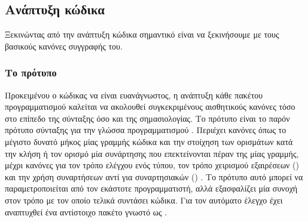 \subsection{Ανάπτυξη κώδικα}
Ξεκινώντας από την ανάπτυξη κώδικα σημαντικό είναι να ξεκινήσουμε με τους βασικούς κανόνες συγγραφής του.
\subsubsection{Το πρότυπο }
Προκειμένου ο κώδικας να είναι ευανάγνωστος, η ανάπτυξη κάθε πακέτου προγραμματισμού  καλείται να ακολουθεί συγκεκριμένους αισθητικούς κανόνες τόσο στο επίπεδο της σύνταξης όσο και της σημασιολογίας.
Το πρότυπο  είναι το παρόν πρότυπο σύνταξης για την γλώσσα προγραμματισμού .
Περιέχει κανόνες όπως το μέγιστο δυνατό μήκος μίας γραμμής κώδικα και την στοίχηση των ορισμάτων κατά την κλήση ή τον ορισμό μία συνάρτησης που επεκτείνονται πέραν της μίας γραμμής, μέχρι κανόνες για τον τρόπο ελέγχου ενός τύπου, τον τρόπο χειρισμού εξαιρέσεων () και την χρήση συναρτήσεων αντί για συναρτησιακών () \cite{PEP8}.
Το πρότυπο αυτό μπορεί να παραμετροποιείται από τον εκάστοτε προγραμματιστή, αλλά εξασφαλίζει μία συνοχή στον τρόπο με τον οποίο τελικά συντάσει κώδικα.
Για τον αυτόματο έλεγχο έχει αναπτυχθεί ένα αντίστοιχο πακέτο γνωστό ως \href{https://pypi.org/project/flake8/}{}.
